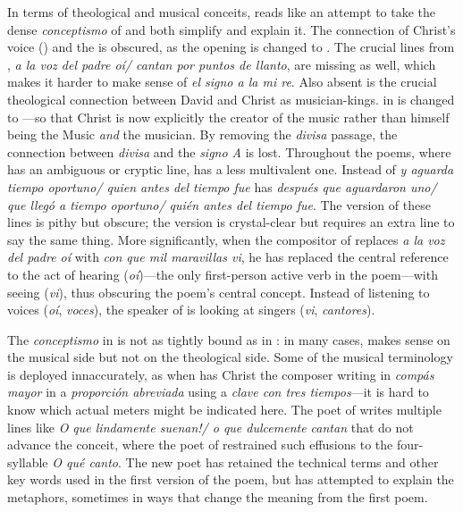 In terms of theological and musical conceits,  reads like an
attempt to take the dense \emph{conceptismo} of  and both simplify
and explain it.
The connection of Christ's voice () and the  is obscured, as the opening is changed to .
The crucial lines from , \emph{a la voz del padre oí/ cantan por
puntos de llanto}, are missing as well, which makes it harder to make sense of
\emph{el signo a la mi re}.
Also absent is the crucial theological connection between David and Christ as
musician-kings.
 in  is changed to ---so that Christ is now explicitly the creator of the music
rather than himself being the Music \emph{and} the musician.
By removing the \emph{divisa} passage, the connection between \emph{divisa} and
the \emph{signo A} is lost.
Throughout the poems, where  has an ambiguous or cryptic line,
 has a less multivalent one. 
Instead of \emph{y aguarda tiempo oportuno/ quien antes del tiempo fue}
 has \emph{después que aguardaron uno/ que llegó a tiempo
oportuno/ quién antes del tiempo fue}.
The  version of these lines is pithy but obscure; the
 version is crystal-clear but requires an extra line to say the
same thing.
More significantly, when the compositor of  replaces \emph{a la
voz del padre oí} with \emph{con que mil maravillas vi}, he has replaced the
central reference to the act of hearing (\emph{oí})---the only first-person
active verb in the poem---with seeing (\emph{vi}), thus obscuring the poem's
central concept. 
Instead of listening to voices (\emph{oí}, \emph{voces}), the speaker of
 is looking at singers (\emph{vi}, \emph{cantores}).

The \emph{conceptismo} in  is not as tightly bound as in
: in many cases,  makes sense on the musical side
but not on the theological side.
Some of the musical terminology is deployed innaccurately, as when
 has Christ the composer writing in \emph{compás mayor} in a
\emph{proporción abreviada} using a \emph{clave con tres tiempos}---it is hard
to know which actual meters might be indicated here.
The poet of  writes multiple lines like \emph{O que lindamente
suenan!/ o que dulcemente cantan} that do not advance the conceit, where the
poet of  restrained such effusions to the four-syllable \emph{O
qué canto}.
The new poet has retained the technical terms and other key words used in the
first version of the poem, but has attempted to explain the metaphors, sometimes
in ways that change the meaning from the first poem.

